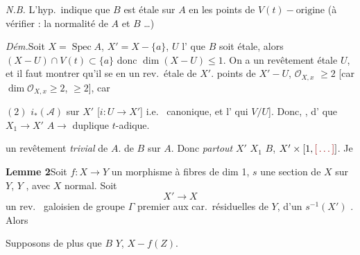 \documentclass[11pt,a4paper]{article}
\begin{document}
\emph{N.B.} L'hyp.\ indique que $B$ est étale sur $A$ en les points de
$V(t) - \text{origine}$ (à vérifier : la normalité de \ill{} $A$ et $B$
\ldots) 

\emph{Dém.}\quad Soit $X = \operatorname{Spec} A$,  $X' = X -
\{a\}$, $U$ l'\ill{} \ill{} \ill{} \ill{} que $B$  soit étale, alors
\struck{[on a $U \ne X$]} $(X - U) \cap V(t) \subset \{a\}$ \ill{} donc
$\dim(X - U) \leqslant 1$. On a \ill{} un revêtement étale \struck{\ill{}}
$U$, et il faut montrer qu'il se \ill{} en un rev.\ étale de $X'$.
\struck{\ill{}} \ill{} points de $X' - U$, \ill{} $\mathcal{O}_{X,x}$
$\geqslant 2$ [car $\dim \mathcal{O}_{X,x} \geqslant 2$, \ill{} $\geqslant
2$], car \ill{} \ill{}


$(2)$ \ill{} \ill{} $i_{*}(\mathcal{A})$ sur $X'$ \ill{} \ill{}
[$i : U \to X'$] i.e.\ \ill{} canonique, et l' 
\ill{} qui \ill{} $V/U$]. Donc, \ill{} \ill{} \ill{}, d'\ill{} \ill{} \ill{}
\ill{} que $X_{1} \to X'$ \ill{} \ill{} $A \to$ \ill{} \ill{}
\struck{\ill{}} duplique $t$-adique.


\ill{} \ill{} un revêtement \emph{trivial} de $A$. \ill{} \ill{}
 de $B$ sur $A$. Donc \emph{partout} \ill{} $X'$ \ill{}
$X_{1}$ \ill{} \ill{} \ill{} $B$, \ill{} $X' \times [1,\ill{}]$. Je \ill{}


\textbf{Lemme 2}\quad Soit $f : X \to Y$   un
morphisme \ill{} à fibres de dim 1, $s$ une section de $X$ sur $Y$,
\struck{\ill{}} $Y$ , \ill{} avec $X$ normal. Soit
\[
X' \longrightarrow X
\]
un rev.\ \ill{} galoisien de groupe $\Gamma$ premier aux car.\ résiduelles de
$Y$, \ill{} \ill{} d'un \ill{} \ill{} \ill{} \ill{} \ill{} $s^{-1}(X')$ \ill{}
\ill{} \ill{}. Alors \ill{}

Supposons de plus que  \ill{} \ill{} \ill{} $B$ \ill{}
$Y$, \ill{} \ill{} \ill{} \ill{} $X - f(Z)$.
\end{document}
